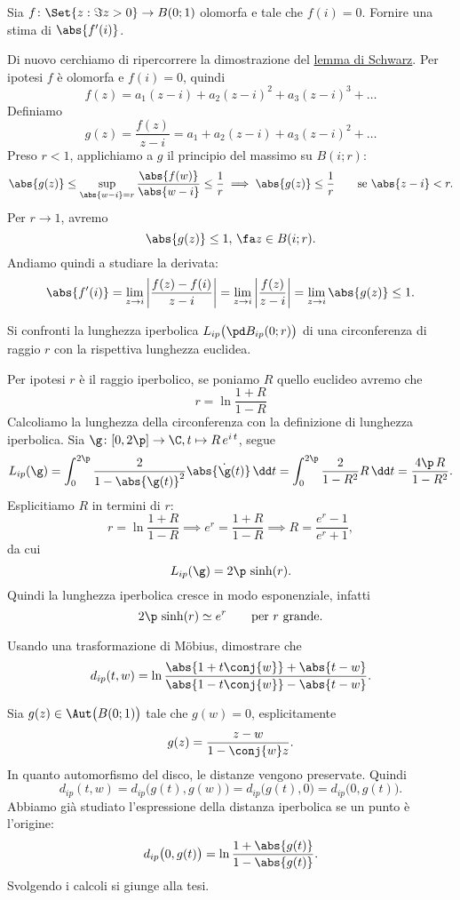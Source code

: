 \begin{exeN}
	Sia \(f\colon \Set{z: \Im z>0} \to B(0;1)\) olomorfa e tale che \(f(i)=0\).
	Fornire una stima di \(\abs{f'(i)}\).
\end{exeN}

\begin{sol}
	Di nuovo cerchiamo di ripercorrere la dimostrazione del \hyperref[th:lemmaSchwarz]{lemma di Schwarz}.
	Per ipotesi \(f\) è olomorfa e \(f(i)=0\), quindi
	\[
		f(z) = a_1 (z-i) + a_2 (z-i)^2 + a_3(z-i)^3 + \ldots
	\]
	Definiamo
	\[
		g(z) = \frac{f(z)}{z-i} = a_1 + a_2 (z-i) + a_3 (z-i)^2 + \ldots
	\]
	Preso \(r<1\), applichiamo a \(g\) il principio del massimo su \(B(i;r)\):
	\[
		\abs{g(z)} \le \sup_{\abs{w-i}=r} \frac{\abs{f(w)}}{\abs{w-i}} \le \frac{1}{r} \implies \abs{g(z)} \le \frac{1}{r} \qquad\text{se }\abs{z-i}<r.
	\]
	Per \(r\to 1\), avremo
	\[
		\abs{g(z)} \le 1,\,\fa z\in B(i;r).
	\]
	Andiamo quindi a studiare la derivata:
	\[
		\abs{f'(i)} = \lim_{z \to i} \bigg\lvert \frac{f(z)-f(i)}{z-i} \bigg\rvert = \lim_{z\to i} \bigg\lvert \frac{f(z)}{z-i} \bigg\rvert = \lim_{z \to i} \abs{g(z)} \le 1.
	\]
\end{sol}

\begin{exeN}
	Si confronti la lunghezza iperbolica \(L_{ip}\big(\pd B_{ip}(0;r)\big)\) di una circonferenza di raggio \(r\) con la rispettiva lunghezza euclidea.
\end{exeN}

\begin{sol}
	Per ipotesi \(r\) è il raggio iperbolico, se poniamo \(R\) quello euclideo avremo che
	\[
		r = \ln \frac{1+R}{1-R}
	\]
	Calcoliamo la lunghezza della circonferenza con la definizione di lunghezza iperbolica.
	Sia \(\g\colon [0,2\p] \to \C, t \mapsto R\,e^{i\,t}\), segue
	\[
		L_{ip}(\g) = \int_0^{2\p} \frac{2}{1-\abs{\g(t)}^2}\abs{\dot{\g}(t)}\,\dd t = \int_0^{2\p} \frac{2}{1-R^2}R\,\dd t = \frac{4\p\,R}{1-R^2}.
	\]
	Esplicitiamo \(R\) in termini di \(r\):
	\[
		r = \ln \frac{1+R}{1-R} \implies e^r = \frac{1+R}{1-R} \implies R = \frac{e^r-1}{e^r+1},
	\]
	da cui
	\[
		L_{ip}(\g) = 2\p\,\sinh(r).
	\]
	Quindi la lunghezza iperbolica cresce in modo esponenziale, infatti
	\[
		2\p\,\sinh(r) \simeq e^r \qquad\text{per \(r\) grande}.
	\]
\end{sol}

\begin{exeN}
	Usando una trasformazione di M\"obius, dimostrare che
	\[
		d_{ip}(t,w) = \ln \frac{\abs{1+t\conj{w}}+\abs{t-w}}{\abs{1-t\conj{w}}-\abs{t-w}}.
	\]
\end{exeN}

\begin{sol}
	Sia \(g(z)\in\Aut\big(B(0;1)\big)\) tale che \(g(w)=0\), esplicitamente
	\[
		g(z) = \frac{z-w}{1-\conj{w}z}.
	\]
	In quanto automorfismo del disco, le distanze vengono preservate. Quindi
	\[
		d_{ip}(t,w) = d_{ip}\big(g(t),g(w)\big) = d_{ip}\big(g(t),0\big) = d_{ip}\big(0,g(t)\big).
	\]
	Abbiamo già studiato l'espressione della distanza iperbolica se un punto è l'origine:
	\[
		d_{ip}\big(0,g(t)\big) = \ln \frac{1+\abs{g(t)}}{1-\abs{g(t)}}.
	\]
	Svolgendo i calcoli si giunge alla tesi.
\end{sol}
